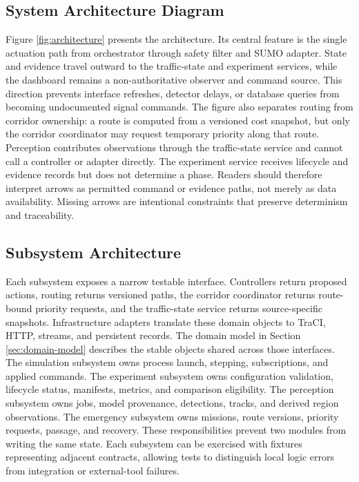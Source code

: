 \subsection{System Architecture Diagram}

Figure \ref{fig:architecture} presents the architecture. Its central feature is the single actuation path from orchestrator through safety filter and SUMO adapter. State and evidence travel outward to the traffic-state and experiment services, while the dashboard remains a non-authoritative observer and command source. This direction prevents interface refreshes, detector delays, or database queries from becoming undocumented signal commands. The figure also separates routing from corridor ownership: a route is computed from a versioned cost snapshot, but only the corridor coordinator may request temporary priority along that route. Perception contributes observations through the traffic-state service and cannot call a controller or adapter directly. The experiment service receives lifecycle and evidence records but does not determine a phase. Readers should therefore interpret arrows as permitted command or evidence paths, not merely as data availability. Missing arrows are intentional constraints that preserve determinism and traceability.

\subsection{Subsystem Architecture}

Each subsystem exposes a narrow testable interface. Controllers return proposed actions, routing returns versioned paths, the corridor coordinator returns route-bound priority requests, and the traffic-state service returns source-specific snapshots. Infrastructure adapters translate these domain objects to TraCI, HTTP, streams, and persistent records. The domain model in Section \ref{sec:domain-model} describes the stable objects shared across those interfaces. The simulation subsystem owns process launch, stepping, subscriptions, and applied commands. The experiment subsystem owns configuration validation, lifecycle status, manifests, metrics, and comparison eligibility. The perception subsystem owns jobs, model provenance, detections, tracks, and derived region observations. The emergency subsystem owns missions, route versions, priority requests, passage, and recovery. These responsibilities prevent two modules from writing the same state. Each subsystem can be exercised with fixtures representing adjacent contracts, allowing tests to distinguish local logic errors from integration or external-tool failures.


